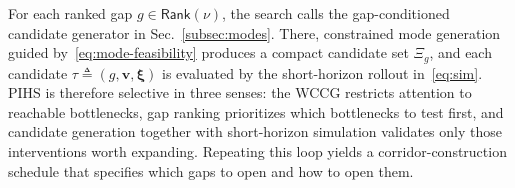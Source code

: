 For each ranked gap $g \in \mathsf{Rank}(\nu)$, the search calls the
gap-conditioned candidate generator in Sec.~\ref{subsec:modes}. There,
constrained mode generation guided by~\eqref{eq:mode-feasibility} produces a
compact candidate set $\Xi_g$, and each candidate
$\tau \triangleq (g,\mathbf{v},\boldsymbol{\xi})$ is evaluated by the
short-horizon rollout in~\eqref{eq:sim}. PIHS is therefore selective in three
senses: the WCCG restricts attention to reachable bottlenecks, gap ranking
prioritizes which bottlenecks to test first, and candidate generation together
with short-horizon simulation validates only those interventions worth
expanding. Repeating this loop yields a corridor-construction schedule that
specifies which gaps to open and how to open them.